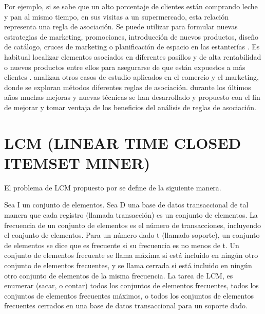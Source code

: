 Por ejemplo, si se sabe que un alto porcentaje de clientes están comprando leche y pan 
al mismo tiempo, en sus visitas a un supermercado, esta relación representa una regla de asociación. Se puede 
utilizar para formular nuevas estrategias de marketing, promociones, introducción de 
nuevos productos, diseño de catálogo, cruces de marketing o planificación de espacio en las
estanterías \cite{han2006data}. Es habitual localizar elementos asociados en diferentes pasillos y de alta rentabilidad
o nuevos productos entre ellos para asegurarse de que están expuestos a más clientes \cite{tsur1998query}. \cite{giudici2005applied} analizan 
otros casos de estudio aplicados en el comercio y el marketing, donde se exploran métodos diferentes reglas
de asociación. durante los últimos años muchas mejoras y nuevas técnicas se han desarrollado y propuesto 
con el fin de mejorar y tomar ventaja de los beneficios del análisis de reglas de asociación.

\section{LCM (LINEAR TIME CLOSED ITEMSET MINER)}

El problema de LCM propuesto por \cite{uno2005lcm} se define de la siguiente manera.

Sea I un conjunto de elementos. Sea D una base de datos transaccional de tal manera que cada 
registro (llamada transacción) es un conjunto de elementos. La frecuencia de un conjunto de 
elementos es el número de transacciones, incluyendo el conjunto de elementos. Para un número dado t 
(llamado soporte), un conjunto de elementos se dice que es frecuente si su frecuencia es no menos de 
t. Un conjunto de elementos frecuente se llama máxima si está incluido en ningún otro conjunto de 
elementos frecuentes, y se llama cerrada si está incluido en ningún otro conjunto de elementos de la 
misma frecuencia. La tarea de LCM, es enumerar (sacar, o contar) todos los conjuntos de elementos 
frecuentes, todos los conjuntos de elementos frecuentes máximos, o todos los conjuntos de elementos 
frecuentes cerrados en una base de datos transaccional para un soporte dado.